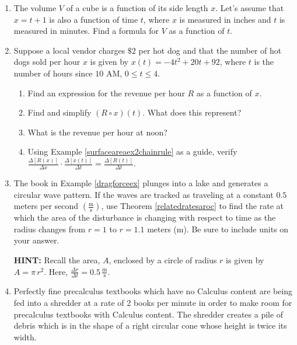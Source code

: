 \documentclass{ximera}
\begin{document}
\begin{enumerate}
\setcounter{enumi}{\value{HW}}


\item The volume $V$ of a cube is a function of its side length $x$.  Let's assume that $x = t + 1$ is also a function of time $t$, where $x$ is measured in inches and $t$ is measured in minutes.  Find a formula for $V$ as a function of $t$.

\item  Suppose a local vendor charges $\$2$ per hot dog and that the number of hot dogs sold per hour $x$ is given by $x(t) = -4t^2+20t+92$, where $t$ is the number of hours since $10$ AM, $0 \leq t \leq 4$.

\begin{enumerate}

\item  Find an expression for the revenue per hour $R$ as a function of $x$.
\item  Find and simplify $\left(R \circ x\right)(t)$.  What does this represent?
\item  What is the revenue per hour at noon?
\item Using Example \ref{surfaceareaex2chainrule} as a guide, verify $\frac{\Delta[R(x)]}{\Delta x} \cdot \frac{\Delta[x(t)]}{\Delta t} = \frac{\Delta[R(t)]}{\Delta t}$.

\end{enumerate}

\item  The book in Example \ref{dragforceex} plunges into a lake and generates a circular wave pattern.  If the waves are tracked as traveling at a constant $0.5$ meters per second $\left( \frac{\text{m}}{\text{s}}\right)$, use Theorem \ref{relatedratesaroc} to find the rate at which the area of the disturbance is changing with respect to time as the radius changes from $r = 1$ to $r = 1.1$ meters (m).  Be sure to include units on your answer.

\smallskip

\textbf{HINT:}  Recall the area, $A$, enclosed by a circle of radius $r$ is given by $A = \pi \, r^2$.  Here, $\frac{\Delta r}{\Delta t} = 0.5 \, \frac{\text{m}}{\text{s}}$.  

\item   Perfectly fine precalculus textbooks which have no Calculus content are being fed into a shredder at a rate of 2 books per minute in order to make room for precalculus textbooks with Calculus content.  The shredder creates a pile of debris which is in the shape of a right circular cone whose height is twice its width. 


\end{enumerate}
\end{document}
